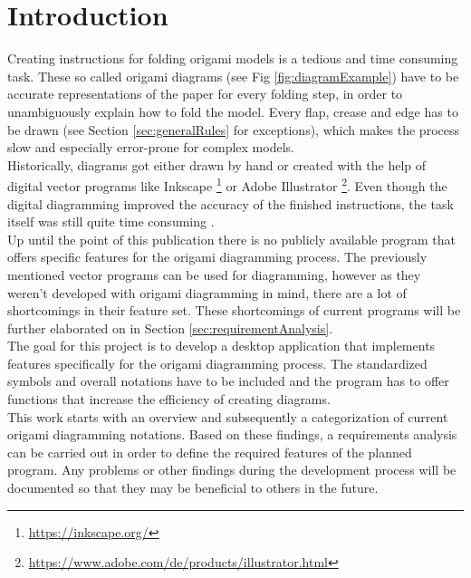 
\section{Introduction}
\label{sec:introduction}

Creating instructions for folding \gls{origami} models is a tedious and time consuming task. These so called origami diagrams (see Fig \ref{fig:diagramExample}) have to be accurate representations of the paper for every folding step, in order to unambiguously explain how to fold the model. Every flap, crease and edge has to be drawn (see Section \ref{sec:generalRules} for exceptions), which makes the process slow and especially error-prone for complex models.\\
Historically, diagrams got either drawn by hand or created with the help of digital vector programs like Inkscape \footnote{\url{https://inkscape.org/}} or Adobe Illustrator \footnote{\url{https://www.adobe.com/de/products/illustrator.html}}. Even though the digital diagramming improved the accuracy of the finished instructions, the task itself was still quite time consuming \cite{???}.\\
Up until the point of this publication there is no publicly available program that offers specific features for the origami diagramming process. The previously mentioned vector programs can be used for diagramming, however as they weren't developed with origami diagramming in mind, there are a lot of shortcomings in their feature set. These shortcomings of current programs will be further elaborated on in Section \ref{sec:requirementAnalysis}.\\
The goal for this project is to develop a desktop application that implements features specifically for the origami diagramming process. The standardized symbols and overall notations have to be included and the program has to offer functions that increase the efficiency of creating diagrams.\\
This work starts with an overview and subsequently a categorization of current origami diagramming notations. Based on these findings, a requirements analysis can be carried out in order to define the required features of the planned program. Any problems or other findings during the development process will be documented so that they may be beneficial to others in the future.